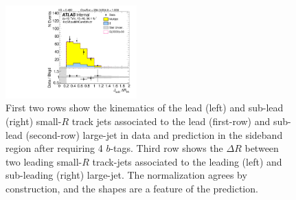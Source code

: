 \begin{figure}[htbp!]
\begin{center}
\includegraphics[width=0.45\textwidth,angle=-90]{figures/boosted/Sideband/b77_FourTag_Sideband_sublHCand_trk_dr.pdf}
  \caption{First two rows show the kinematics of the lead (left) and sub-lead (right) small-$R$ track jets associated to the lead (first-row) and sub-lead (second-row) large-\R jet in data and prediction in the sideband region after requiring 4 $b$-tags. Third row shows the $\Delta R$ between two leading small-$R$ track-jets associated to the leading (left) and sub-leading (right) large-\R jet. The normalization agrees by construction, and the shapes are a feature of the prediction. }
  \label{fig:boosted-4b-sideband-ak2}
\end{center}
\end{figure}


